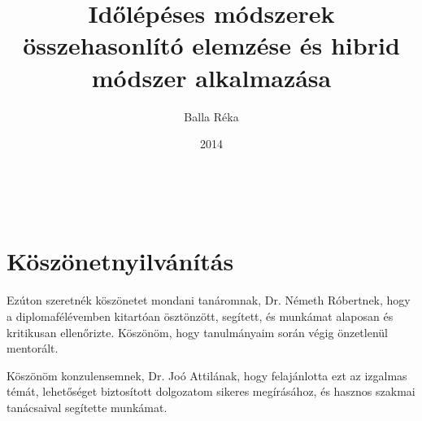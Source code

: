 \documentclass[a4paper,12pt]{report}
\title{Időlépéses módszerek összehasonlító elemzése és hibrid módszer alkalmazása}
\author{Balla Réka}
\date{2014}
\begin{document}

 \thispagestyle{empty}
 
 
\newpage

\setcounter{page}{1}


\begin{abstract}



\end{abstract}



\begin{abstract}



\end{abstract}



\tableofcontents


\listoffigures



\listoftables

\newpage
{~ }\\
\vspace{5cm}

\section*{Köszönetnyilvánítás}

Ezúton szeretnék köszönetet mondani tanáromnak, Dr. Németh Róbertnek, hogy a  diplomafélévemben kitartóan ösztönzött, segített, és  munkámat alaposan és kritikusan ellenőrizte. Köszönöm, hogy  tanulmányaim során végig önzetlenül mentorált.

Köszönöm konzulensemnek, Dr. Joó Attilának, hogy felajánlotta ezt az izgalmas témát, lehetőséget biztosított dolgozatom sikeres megírásához, és hasznos szakmai tanácsaival segítette munkámat.
\end{document}
